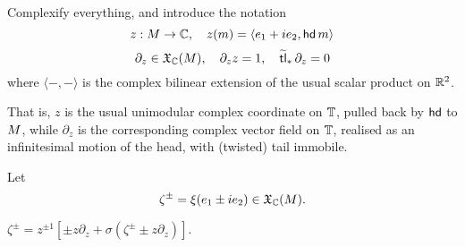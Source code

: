 Complexify everything, and introduce the notation
\[
        z : M\to{\mathbb{C}},\quad     z(m) = \langle e_1+ie_2, \operatorname{\mathsf{hd}} m \rangle
\]
\[
        \partial_z \in \mathfrak{X}_{{\mathbb{C}}}(M), \quad \partial_z z = 1, \quad \operatorname{\widetilde{\operatorname{\mathsf{tl}}}}_* \partial_z = 0
\]
where $\langle-,-\rangle$ is the complex bilinear extension of the usual
scalar product on ${\mathbb{R}}^2$.

That is, $z$ is the usual unimodular complex coordinate
on ${\mathbb{T}}$, pulled back by $\operatorname{\mathsf{hd}}$ to $M$, while $\partial_z$ is the corresponding
complex vector field on ${\mathbb{T}}$, realised as an infinitesimal motion
of the head, with (twisted) tail immobile.

Let
\[
    \zeta^\pm = \xi(e_1\pm ie_2) \in \mathfrak{X}_{{\mathbb{C}}}(M).
\]
\begin{prop}\label{prop:zeta-rec}
 $\zeta^\pm = z^{\pm1} [ \pm z \partial_z + \sigma (\zeta^\pm\pm z \partial_z) ]$.
\end{prop}
